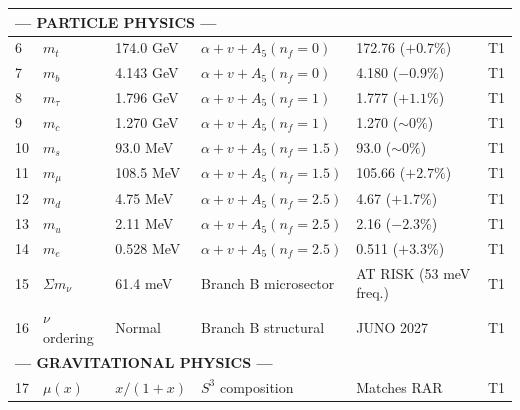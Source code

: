 \documentclass[12pt,a4paper]{article}
\begin{document}
{\begin{longtable}{p{0.4cm}p{2.3cm}p{2.8cm}p{2.4cm}p{2.2cm}p{1.5cm}}
\midrule
\multicolumn{6}{l}{\textbf{\textcolor{derived}{--- PARTICLE PHYSICS ---}}} \\
\midrule

6 & $m_t$ & 174.0 GeV &
  $\alpha + v + A_5(n_f=0)$ &
  172.76 ($+0.7\%$) &
  \textcolor{tier1}{T1} \\[2pt]

7 & $m_b$ & 4.143 GeV &
  $\alpha + v + A_5(n_f=0)$ &
  4.180 ($-0.9\%$) &
  \textcolor{tier1}{T1} \\[2pt]

8 & $m_\tau$ & 1.796 GeV &
  $\alpha + v + A_5(n_f=1)$ &
  1.777 ($+1.1\%$) &
  \textcolor{tier1}{T1} \\[2pt]

9 & $m_c$ & 1.270 GeV &
  $\alpha + v + A_5(n_f=1)$ &
  1.270 ($\sim 0\%$) &
  \textcolor{tier1}{T1} \\[2pt]

10 & $m_s$ & 93.0 MeV &
  $\alpha + v + A_5(n_f=1.5)$ &
  93.0 ($\sim 0\%$) &
  \textcolor{tier1}{T1} \\[2pt]

11 & $m_\mu$ & 108.5 MeV &
  $\alpha + v + A_5(n_f=1.5)$ &
  105.66 ($+2.7\%$) &
  \textcolor{tier1}{T1} \\[2pt]

12 & $m_d$ & 4.75 MeV &
  $\alpha + v + A_5(n_f=2.5)$ &
  4.67 ($+1.7\%$) &
  \textcolor{tier1}{T1} \\[2pt]

13 & $m_u$ & 2.11 MeV &
  $\alpha + v + A_5(n_f=2.5)$ &
  2.16 ($-2.3\%$) &
  \textcolor{tier1}{T1} \\[2pt]

14 & $m_e$ & 0.528 MeV &
  $\alpha + v + A_5(n_f=2.5)$ &
  0.511 ($+3.3\%$) &
  \textcolor{tier1}{T1} \\[2pt]

15 & $\Sigma m_\nu$ & 61.4 meV &
  Branch B microsector &
  AT RISK (53 meV freq.) &
  \textcolor{tier1}{T1} \\[2pt]

16 & $\nu$ ordering & Normal &
  Branch B structural &
  JUNO 2027 &
  \textcolor{tier1}{T1} \\[3pt]

\midrule
\multicolumn{6}{l}{\textbf{\textcolor{derived}{--- GRAVITATIONAL PHYSICS ---}}} \\
\midrule

17 & $\mu(x)$ & $x/(1+x)$ &
  $S^3$ composition &
  Matches RAR &
  \textcolor{tier1}{T1} \\[2pt]


\end{longtable}}
\end{document}
